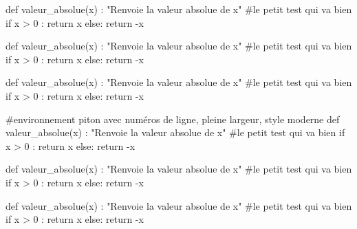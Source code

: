 \documentclass[french,a4paper,10pt]{article}
\begin{document}
\begin{CodePiton}[Largeur=10cm,CouleurNombres=olive]{}
def valeur_absolue(x) :
	"Renvoie la valeur absolue de x"
	#le petit test qui va bien
	if x > 0 :
		return x
	else:
		return -x
\end{CodePiton}

\pagebreak

{\small \begin{codehigh}
\begin{CodePiton}[Style=Carbon,Largeur=10cm,Alignement=center]{}
def valeur_absolue(x) :
    "Renvoie la valeur absolue de x"
    #le petit test qui va bien
    if x > 0 :
        return x
    else:
    return -x
\end{CodePiton}
\end{codehigh}}

\begin{CodePiton}[Style=Carbon,Largeur=10cm,Alignement=center]{}
def valeur_absolue(x) :
	"Renvoie la valeur absolue de x"
	#le petit test qui va bien
	if x > 0 :
		return x
	else:
		return -x
\end{CodePiton}

{\small \begin{codehigh}
\begin{CodePiton}%
    [Largeur=0.5\linewidth,Cadre=false,Alignement=flush right,Filigrane,Titre={Script}]{}
#environnement piton avec numéros de ligne, pleine largeur, style moderne
def valeur_absolue(x) :
    "Renvoie la valeur absolue de x"
    #le petit test qui va bien
    if x > 0 :
        return x
    else:
    return -x
\end{CodePiton}
\end{codehigh}}

\begin{CodePiton}[Largeur=0.5\linewidth,Cadre=false,Alignement=flush right,Filigrane,Titre={Script}]{}
def valeur_absolue(x) :
	"Renvoie la valeur absolue de x"
	#le petit test qui va bien
	if x > 0 :
		return x
	else:
		return -x
\end{CodePiton}

{\small \begin{codehigh}
\begin{CodePiton}[Style=Onglet,Couleur=red,Largeur=11cm,Filigrane,Alignement=flush left,Lignes=false]{}
def valeur_absolue(x) :
    "Renvoie la valeur absolue de x"
    #le petit test qui va bien
    if x > 0 :
        return x
    else:
    return -x
\end{CodePiton}
\end{codehigh}}
\end{document}
